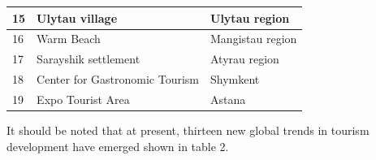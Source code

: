 \begin{table}[H]
\begin{tabular}{|l|l|l|}
15 & Ulytau village                      & Ulytau region            \\ \hline
16 & Warm Beach                          & Mangistau region         \\ \hline
17 & Sarayshik settlement                & Atyrau region            \\ \hline
18 & Center for Gastronomic Tourism      & Shymkent                 \\ \hline
19 & Expo Tourist Area                   & Astana                   \\ \hline
\end{tabular}
\end{table}

It should be noted that at present, thirteen new global trends in
tourism development have emerged shown in table 2.

